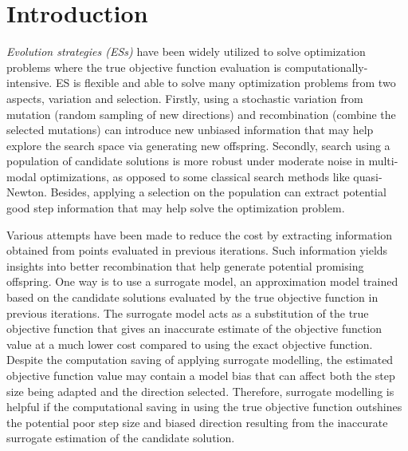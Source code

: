 \section{Introduction}

\textit{Evolution strategies (ESs)} have been widely utilized to solve optimization problems where the true objective function evaluation is computationally-intensive. ES is flexible and able to solve many optimization problems from two aspects, variation and selection. Firstly, using a stochastic variation from mutation (random sampling of new directions) and recombination (combine the selected mutations) can introduce new unbiased information that may help explore the search space via generating new offspring. Secondly, search using a population of candidate solutions is more robust under moderate noise in multi-modal optimizations, as opposed to some classical search methods like quasi-Newton. Besides, applying a selection on the population can extract potential good step information that may help solve the optimization problem. 

Various attempts have been made to reduce the cost by extracting information obtained from points evaluated in previous iterations. Such information yields insights into better recombination that help generate potential promising offspring. One way is to use a surrogate model, an approximation model trained based on the candidate solutions evaluated by the true objective function in previous iterations. The surrogate model acts as a substitution of the true objective function that gives an inaccurate estimate of the objective function value at a much lower cost compared to using the exact objective function. Despite the computation saving of applying surrogate modelling, the estimated objective function value may contain a model bias that can affect both the step size being adapted and the direction selected. Therefore, surrogate modelling is helpful if the computational saving in using the true objective function outshines the potential poor step size and biased direction resulting from the inaccurate surrogate estimation of the candidate solution. 

